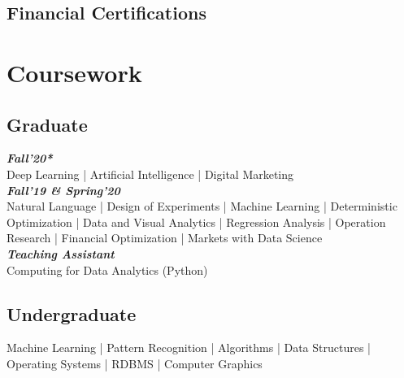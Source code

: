 \documentclass[]{resume-openfont}
\begin{document}
\begin{minipage}[t]{0.33\textwidth}
\subsection{Financial Certifications}


\section{Coursework}
\subsection{Graduate}
{\footnotesize \textit{\textbf{Fall'20*}}} \\
Deep Learning | Artificial Intelligence | 
Digital Marketing \\
{\footnotesize \textit{\textbf{Fall'19 \& Spring'20}}} \\
Natural Language | 
Design of Experiments | 
Machine Learning | 
Deterministic Optimization |
Data and Visual Analytics | 
Regression Analysis |
Operation Research | 
Financial Optimization |
Markets with Data Science\\
{\footnotesize \textit{\textbf{Teaching Assistant}}} \\
Computing for Data Analytics (Python)\\
\sectionsep

\subsection{Undergraduate}
Machine Learning | 
Pattern Recognition |
Algorithms | Data Structures |
Operating Systems |
RDBMS |
Computer Graphics \\ 


%
%

\end{minipage} 
\hfill
\end{document}
